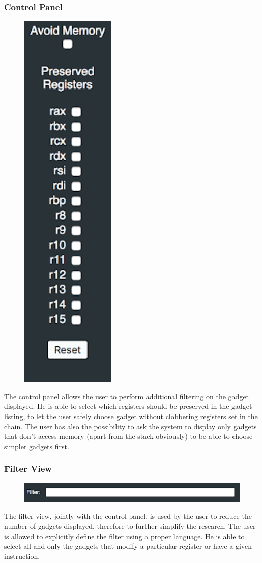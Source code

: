 \documentclass[twocolumn, 11pt]{article}
\begin{document}
\subsubsection{Control Panel}
\begin{figure}[htb]
  \centering
  \includegraphics[width=0.15\linewidth]{control-panel}
\end{figure}

The control panel allows the user to perform additional filtering on the gadget displayed. He is able to select which registers should be preserved in the gadget listing, to let the user safely choose gadget without clobbering registers set in the chain. The user has also the possibility to ask the system to display only gadgets that don't access memory (apart from the stack obviously) to be able to choose simpler gadgets first.

\subsubsection{Filter View}
\begin{figure}[htb]
  \centering
  \includegraphics[width=0.8\linewidth]{filter-view}
\end{figure}

The filter view, jointly with the control panel, is used by the user to reduce the number of gadgets displayed, therefore to further simplify the research. The user is allowed to explicitly define the filter using a proper language. He is able to select all and only the gadgets that modify a particular register or have a given instruction.
\end{document}
